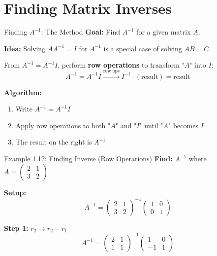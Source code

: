 \documentclass[10pt]{beamer}
\theoremstyle{definition}
\newcommand{\x}[1]{\alert{\textbf{#1}}}
\begin{document}

\section{Finding Matrix Inverses}

\begin{frame}{Finding $A^{-1}$: The Method}
\textbf{Goal:} Find $A^{-1}$ for a given matrix $A$.

\vspace{0.3cm}
\textbf{Idea:} Solving $AA^{-1} = I$ for $A^{-1}$ is a special case of solving $AB = C$.

\vspace{0.3cm}
From $A^{-1} = A^{-1}I$, perform \x{row operations} to transform "$A$" into $I$:
$$A^{-1} = A^{-1}I \xrightarrow{\text{row ops}} I^{-1} \cdot (\text{result}) = \text{result}$$

\vspace{0.3cm}
\textbf{Algorithm:}
\begin{enumerate}
\item Write $A^{-1} = A^{-1}I$
\item Apply row operations to both "$A$" and "$I$" until "$A$" becomes $I$
\item The result on the right is $A^{-1}$
\end{enumerate}
\end{frame}

\begin{frame}{Example 1.12: Finding Inverse (Row Operations)}
\textbf{Find:} $A^{-1}$ where $A = \begin{pmatrix} 2 & 1 \\ 3 & 2 \end{pmatrix}$

\textbf{Setup:}
$$A^{-1} = \begin{pmatrix} 2 & 1 \\ 3 & 2 \end{pmatrix}^{-1} \begin{pmatrix} 1 & 0 \\ 0 & 1 \end{pmatrix}$$

\textbf{Step 1:} $r_2 \to r_2 - r_1$
$$A^{-1} = \begin{pmatrix} 2 & 1 \\ 1 & 1 \end{pmatrix}^{-1} \begin{pmatrix} 1 & 0 \\ -1 & 1 \end{pmatrix}$$
\end{frame}
\end{document}
